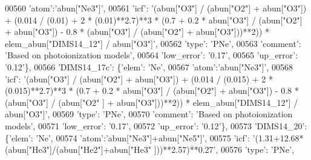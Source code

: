 \begin{DoxyCode}
00560                                        \textcolor{stringliteral}{'atom'}:\textcolor{stringliteral}{'abun["Ne3"]'}, 
00561                                        \textcolor{stringliteral}{'icf'}: \textcolor{stringliteral}{'(abun["O3"] / (abun["O2"] + abun["O3"]) + (0.014 / (0.01) +
       2 * (0.01)**2.7)**3 * (0.7 + 0.2 * abun["O3"] / (abun["O2"] + abun["O3"]) - 0.8 * (abun["O3"] / (abun["O2"]
       + abun["O3"]))**2)) * elem\_abun["DIMS14\_12"] / abun["O3"]'},
00562                                        \textcolor{stringliteral}{'type'}: \textcolor{stringliteral}{'PNe'},
00563                                        \textcolor{stringliteral}{'comment'}: \textcolor{stringliteral}{'Based on photoionization models'},
00564                                        \textcolor{stringliteral}{'low\_error'}: \textcolor{stringliteral}{'0.17'},
00565                                        \textcolor{stringliteral}{'up\_error'}: \textcolor{stringliteral}{'0.12'}\},
00566                          \textcolor{stringliteral}{'DIMS14\_17c'}: \{\textcolor{stringliteral}{'elem'}: \textcolor{stringliteral}{'Ne'},
00567                                        \textcolor{stringliteral}{'atom'}:\textcolor{stringliteral}{'abun["Ne3"]'}, 
00568                                        \textcolor{stringliteral}{'icf'}: \textcolor{stringliteral}{'(abun["O3"] / (abun["O2"] + abun["O3"]) + (0.014 / (0.015) +
       2 * (0.015)**2.7)**3 * (0.7 + 0.2 * abun["O3"] / (abun["O2"] + abun["O3"]) - 0.8 * (abun["O3"] / (abun["O2"
      ] + abun["O3"]))**2)) * elem\_abun["DIMS14\_12"] / abun["O3"]'},
00569                                        \textcolor{stringliteral}{'type'}: \textcolor{stringliteral}{'PNe'},
00570                                        \textcolor{stringliteral}{'comment'}: \textcolor{stringliteral}{'Based on photoionization models'},
00571                                        \textcolor{stringliteral}{'low\_error'}: \textcolor{stringliteral}{'0.17'},
00572                                        \textcolor{stringliteral}{'up\_error'}: \textcolor{stringliteral}{'0.12'}\},
00573                          \textcolor{stringliteral}{'DIMS14\_20'}: \{\textcolor{stringliteral}{'elem'}: \textcolor{stringliteral}{'Ne'},
00574                                        \textcolor{stringliteral}{'atom'}:\textcolor{stringliteral}{'abun["Ne3"]+abun["Ne5"]'}, 
00575                                        \textcolor{stringliteral}{'icf'}: \textcolor{stringliteral}{'(1.31+12.68*(abun["He3"]/(abun["He2"]+abun["He3"
      ]))**2.57)**0.27'},
00576                                        \textcolor{stringliteral}{'type'}: \textcolor{stringliteral}{'PNe'},

\end{DoxyCode}
